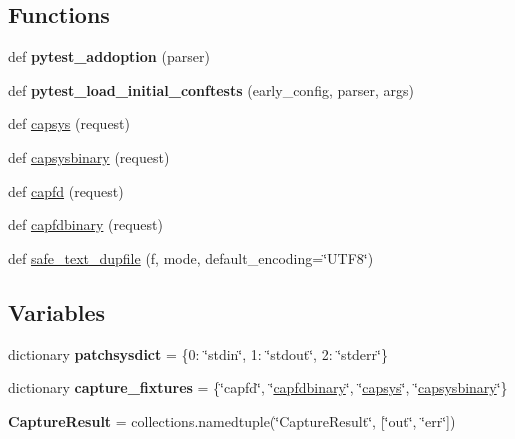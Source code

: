 \subsection*{Functions}
\begin{DoxyCompactItemize}
\item 
\mbox{\label{namespace__pytest_1_1capture_a1f0628312a3e38f5f5e584120717156f}} 
def {\bfseries pytest\+\_\+addoption} (parser)
\item 
\mbox{\label{namespace__pytest_1_1capture_a98cbc831a9c6f10cc974feeb490193a7}} 
def {\bfseries pytest\+\_\+load\+\_\+initial\+\_\+conftests} (early\+\_\+config, parser, args)
\item 
def \hyperlink{namespace__pytest_1_1capture_a0c9a4fc3173a5ab87c7066f3911666e8}{capsys} (request)
\item 
def \hyperlink{namespace__pytest_1_1capture_ae1f2a75a93becc62b712162e84b6e955}{capsysbinary} (request)
\item 
def \hyperlink{namespace__pytest_1_1capture_a071b8199e1357caed85740df9b2fb1f6}{capfd} (request)
\item 
def \hyperlink{namespace__pytest_1_1capture_a59bfc1c8065be6fcee0965d2587bd346}{capfdbinary} (request)
\item 
def \hyperlink{namespace__pytest_1_1capture_a5cbb0426ce1caa95e8c8951c408e3a6b}{safe\+\_\+text\+\_\+dupfile} (f, mode, default\+\_\+encoding=\char`\"{}U\+T\+F8\char`\"{})
\end{DoxyCompactItemize}
\subsection*{Variables}
\begin{DoxyCompactItemize}
\item 
\mbox{\label{namespace__pytest_1_1capture_ab72206f311d414678c8bd729f5de8931}} 
dictionary {\bfseries patchsysdict} = \{0\+: \char`\"{}stdin\char`\"{}, 1\+: \char`\"{}stdout\char`\"{}, 2\+: \char`\"{}stderr\char`\"{}\}
\item 
\mbox{\label{namespace__pytest_1_1capture_a4aebbdea006de16031d6bdd292ab738a}} 
dictionary {\bfseries capture\+\_\+fixtures} = \{\char`\"{}capfd\char`\"{}, \char`\"{}\hyperlink{namespace__pytest_1_1capture_a59bfc1c8065be6fcee0965d2587bd346}{capfdbinary}\char`\"{}, \char`\"{}\hyperlink{namespace__pytest_1_1capture_a0c9a4fc3173a5ab87c7066f3911666e8}{capsys}\char`\"{}, \char`\"{}\hyperlink{namespace__pytest_1_1capture_ae1f2a75a93becc62b712162e84b6e955}{capsysbinary}\char`\"{}\}
\item 
\mbox{\label{namespace__pytest_1_1capture_a2cfd79b49158bf25ad527da3dae70f3f}} 
{\bfseries Capture\+Result} = collections.\+namedtuple(\char`\"{}Capture\+Result\char`\"{}, \mbox{[}\char`\"{}out\char`\"{}, \char`\"{}err\char`\"{}\mbox{]})
\end{DoxyCompactItemize}


